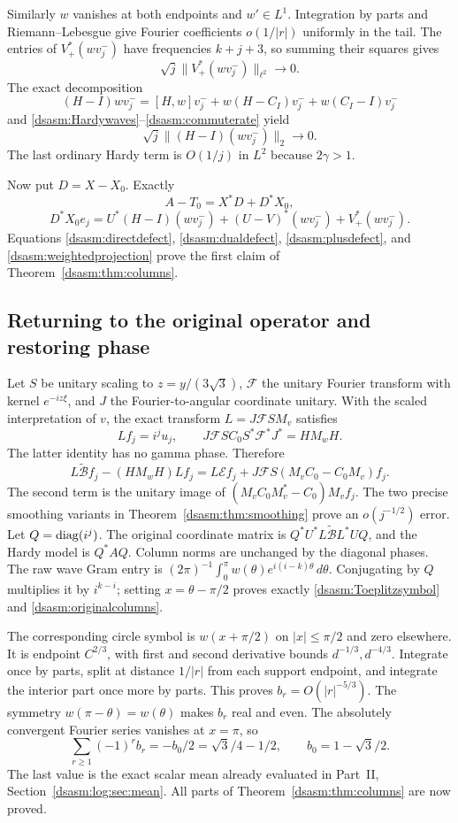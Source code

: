\documentclass[11pt,letterpaper]{article}
\theoremstyle{remark}\newtheorem{remark}[theorem]{Remark}
\begin{document}
Similarly $w$ vanishes at both endpoints and $w'\in L^1$.
Integration by parts and Riemann--Lebesgue give Fourier coefficients
$o(1/|r|)$ uniformly in the tail. The entries of $V_+^*(wv_j^-)$
have frequencies $k+j+3$, so summing their squares gives
\begin{equation}\label{dsasm:plusdefect}
 \sqrt j\|V_+^*(wv_j^-)\|_{\ell^2}\to0.
\end{equation}
The exact decomposition
\[
 (H-I)wv_j^-=[H,w]v_j^-+w(H-C_I)v_j^-+w(C_I-I)v_j^-
\]
and \eqref{dsasm:Hardywaves}--\eqref{dsasm:commuterate} yield
\begin{equation}\label{dsasm:weightedprojection}
 \sqrt j\|(H-I)(wv_j^-)\|_2\to0.
\end{equation}
The last ordinary Hardy term is $O(1/j)$ in $L^2$ because $2\gamma>1$.

Now put $D=X-X_0$. Exactly
\[
 A-T_0=X^*D+D^*X_0,
\]
\[
 D^*X_0e_j=U^*(H-I)(wv_j^-)
       +(U-V)^*(wv_j^-)+V_+^*(wv_j^-).
\]
Equations \eqref{dsasm:directdefect}, \eqref{dsasm:dualdefect},
\eqref{dsasm:plusdefect}, and \eqref{dsasm:weightedprojection} prove the first
claim of Theorem~\ref{dsasm:thm:columns}.

\subsection{Returning to the original operator and restoring phase}
Let $S$ be unitary scaling to $z=y/(3\sqrt3)$, $\mathcal F$ the
unitary Fourier transform with kernel $e^{-iz\xi}$, and $J$ the
Fourier-to-angular coordinate unitary. With the scaled interpretation
of $v$, the exact transform $L=J\mathcal FS M_v$ satisfies
\[
 Lf_j=i^ju_j,\qquad
 J\mathcal FS C_0S^*\mathcal F^*J^*=HM_wH.
\]
The latter identity has no gamma phase. Therefore
\[
 L\widetilde{\mathcal B}f_j-(HM_wH)Lf_j
   =L\mathcal Ef_j+J\mathcal FS(M_vC_0-C_0M_v)f_j.
\]
The second term is the unitary image of
$(M_vC_0M_v^*-C_0)M_vf_j$. The two precise smoothing variants
in Theorem~\ref{dsasm:thm:smoothing} prove an $o(j^{-1/2})$ error.
Let $Q=\operatorname{diag}(i^j)$. The original coordinate matrix is
$Q^*U^*L\widetilde{\mathcal B}L^*UQ$, and the Hardy model is
$Q^*AQ$. Column norms are unchanged by the diagonal phases.
The raw wave Gram entry is
$(2\pi)^{-1}\int_0^\pi w(\theta)e^{i(i-k)\theta}\,d\theta$.
Conjugating by $Q$ multiplies it by $i^{k-i}$; setting
$x=\theta-\pi/2$ proves exactly \eqref{dsasm:Toeplitzsymbol} and
\eqref{dsasm:originalcolumns}.

The corresponding circle symbol is $w(x+\pi/2)$ on
$|x|\le\pi/2$ and zero elsewhere. It is endpoint $C^{2/3}$,
with first and second derivative bounds $d^{-1/3},d^{-4/3}$.
Integrate once by parts, split at distance $1/|r|$ from each
support endpoint, and integrate the interior part once more by
parts. This proves $b_r=O(|r|^{-5/3})$.
The symmetry $w(\pi-\theta)=w(\theta)$ makes $b_r$ real and even.
The absolutely convergent Fourier series vanishes at $x=\pi$, so
\begin{equation}\label{dsasm:alternatingsum}
 \sum_{r\ge1}(-1)^rb_r=-b_0/2=\sqrt3/4-1/2,
 \qquad b_0=1-\sqrt3/2.
\end{equation}
The last value is the exact scalar mean already evaluated in
Part~II, Section~\ref{dsasm:log:sec:mean}. All parts of Theorem~\ref{dsasm:thm:columns}
are now proved.
\end{document}
